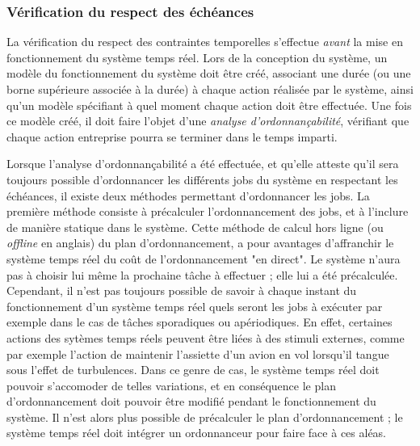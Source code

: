 		\subsubsection{Vérification du respect des échéances}
		La vérification du respect des contraintes temporelles s'effectue \emph{avant} la mise en fonctionnement du système temps réel. Lors de la conception du système, un modèle du fonctionnement du système doit être créé, associant une durée (ou une borne supérieure associée à la durée) à chaque action réalisée par le système, ainsi qu'un modèle spécifiant à quel moment chaque action doit être effectuée. Une fois ce modèle créé, il doit faire l'objet d'une \emph{analyse d'ordonnançabilité}, vérifiant que chaque action entreprise pourra se terminer dans le temps imparti.

		Lorsque l'analyse d'ordonnançabilité a été effectuée, et qu'elle atteste qu'il sera toujours possible d'ordonnancer les différents jobs du système en respectant les échéances, il existe deux méthodes permettant d'ordonnancer les jobs. La première méthode consiste à précalculer l'ordonnancement des jobs, et à l'inclure de manière statique dans le système. Cette méthode de calcul hors ligne (ou \emph{offline} en anglais) du plan d'ordonnancement, a pour avantages d'affranchir le système temps réel du coût de l'ordonnancement "en direct". Le système n'aura pas à choisir lui même la prochaine tâche à effectuer ; elle lui a été précalculée. Cependant, il n'est pas toujours possible de savoir à chaque instant du fonctionnement d'un système temps réel quels seront les jobs à exécuter par exemple dans le cas de tâches sporadiques ou apériodiques. En effet, certaines actions des sytèmes temps réels peuvent être liées à des stimuli externes, comme par exemple l'action de maintenir l'assiette d'un avion en vol lorsqu'il tangue sous l'effet de turbulences. Dans ce genre de cas, le système temps réel doit pouvoir s'accomoder de telles variations, et en conséquence le plan d'ordonnancement doit pouvoir être modifié pendant le fonctionnement du système. Il n'est alors plus possible de précalculer le plan d'ordonnancement ; le système temps réel doit intégrer un ordonnanceur pour faire face à ces aléas.

